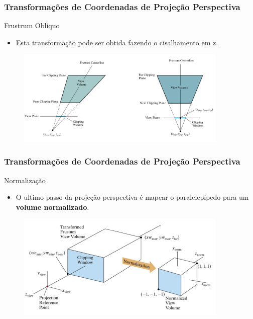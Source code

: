 \documentclass{beamer}
\begin{document}
\begin{frame}
\frametitle{Transformações de Coordenadas de Projeção Perspectiva}
	\begin{block}{Frustrum Oblíquo}
		\begin{itemize}
			\item Esta transformação pode ser obtida fazendo o cisalhamento em z.
		\end{itemize}	
	\end{block}
	
		\begin{figure}[!h]
			\begin{center}
			\includegraphics[width=0.9\textwidth]{Figures/TraFru}
			\end{center}
	\end{figure}
\end{frame}

\begin{frame}
\frametitle{Transformações de Coordenadas de Projeção Perspectiva}
	\begin{block}{Normalização}
		\begin{itemize}
			\item O ultimo passo da projeção perspectiva é mapear o paralelepípedo para um \textbf{volume normalizado}.
		\end{itemize}	
	\end{block}
	
		\begin{figure}[!h]
			\begin{center}
			\includegraphics[width=0.9\textwidth]{Figures/VolVisNor}
			\end{center}
	\end{figure}
\end{frame}
\end{document}
